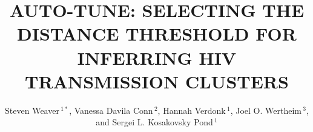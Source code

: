 \documentclass[utf8]{FrontiersinHarvard} %
\def\firstAuthorLast{Weaver {et~al.}} %
\def\Authors{Steven Weaver\,$^{1*}$, Vanessa Davila Conn\,$^{2}$, Hannah Verdonk\,$^{1}$, Joel O. Wertheim\,$^{3}$, and Sergei L. Kosakovsky Pond\,$^{1}$}
\begin{document}
\onecolumn
{}

\title { AUTO-TUNE: SELECTING THE DISTANCE THRESHOLD FOR INFERRING HIV TRANSMISSION CLUSTERS }

\author[\firstAuthorLast ]{\Authors} %
\address{} %
\correspondance{} %

\extraAuth{}%

\maketitle
\end{document}
